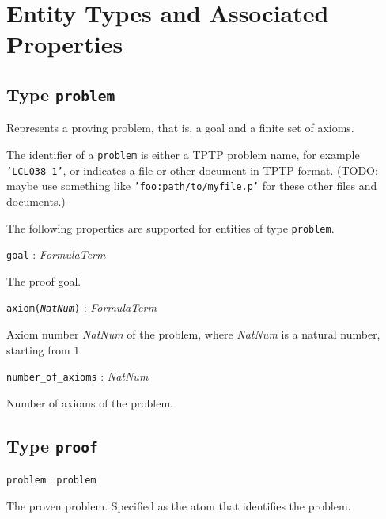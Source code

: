 \documentclass[a4paper,11pt]{article}
\newcommand{\f}[1]{\texttt{#1}}
\newcommand{\var}[1]{\textnormal{\textit{#1}}}
\newcommand{\lit}[1]{\textnormal{\textit{#1}}}
\newcommand{\propsig}[2]
{\noindent \f{#1} : #2}
\newcommand{\propdesc}[1]
{\par \hspace*{\fill}\begin{minipage}{0.9\textwidth}#1\end{minipage}\par\smallskip}
\begin{document}
\section{Entity Types and Associated Properties}

\subsection{Type \f{problem}}

Represents a proving problem, that is, a goal and a finite set of axioms.

The identifier of a \f{problem} is either a TPTP problem name, for example
\f{'LCL038-1'}, or indicates a file or other document in TPTP format. (TODO:
maybe use something like \f{'foo:path/to/myfile.p'} for these other files and
documents.)

The following properties are supported for entities of type \f{problem}.

\propsig{goal}{\lit{FormulaTerm}}

\propdesc{The proof goal.}

\propsig{axiom(\var{NatNum})}{\lit{FormulaTerm}}

\propdesc{Axiom number \var{NatNum} of the problem, where \var{NatNum} is a
  natural number, starting from $1$.}

\propsig{number\_of\_axioms}{\lit{NatNum}}

\propdesc{Number of axioms of the problem.}

% 
% 

\subsection{Type \f{proof}}                       

\propsig{problem}{\f{problem}}

\propdesc{The proven problem. Specified as the atom that identifies the
  problem.}
\end{document}
